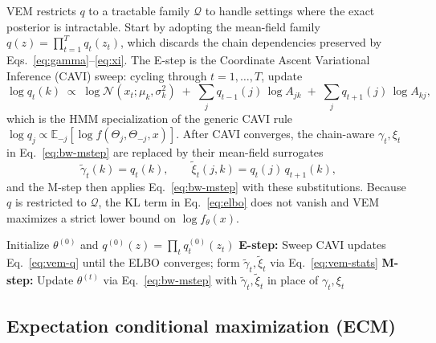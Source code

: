 \documentclass{article}
\newcommand{\E}{\mathbb{E}}
\newcommand{\KL}{\mathrm{KL}}
\begin{document}
VEM restricts $q$ to a tractable family $\mathcal{Q}$ to handle settings
where the exact posterior is intractable. Start by adopting the mean-field family
$q(z) = \prod_{t=1}^T q_t(z_t)$, which discards the chain dependencies
preserved by Eqs.~\eqref{eq:gamma}--\eqref{eq:xi}. The E-step is the
Coordinate Ascent Variational Inference (CAVI) sweep: cycling through $t = 1, \ldots, T$, update
\begin{equation}
  \log q_t(k) \;\propto\;
  \log \mathcal{N}(x_t; \mu_k, \sigma_k^2)
  \;+\; \sum_j q_{t-1}(j)\,\log A_{jk}
  \;+\; \sum_j q_{t+1}(j)\,\log A_{kj},
  \label{eq:vem-q}
\end{equation}
which is the HMM specialization of the generic CAVI rule
$\log q_j \propto \E_{-j}[\log f(\Theta_j, \Theta_{-j}, x)]$.
After CAVI converges, the chain-aware
$\gamma_t, \xi_t$ in Eq.~\eqref{eq:bw-mstep} are replaced by their
mean-field surrogates
\begin{equation}
  \tilde\gamma_t(k) = q_t(k), \qquad
  \tilde\xi_t(j,k)  = q_t(j)\, q_{t+1}(k),
  \label{eq:vem-stats}
\end{equation}
and the M-step then applies Eq.~\eqref{eq:bw-mstep} with these
substitutions. Because $q$ is restricted to $\mathcal{Q}$, the $\KL$
term in Eq.~\eqref{eq:elbo} does not vanish and VEM maximizes a strict
lower bound on $\log f_\theta(x)$.

\begin{algorithm}[ht]
  \caption{Variational EM (mean-field)}
  \begin{algorithmic}[1]
    \State Initialize $\theta^{(0)}$ and $q^{(0)}(z) = \prod_t q_t^{(0)}(z_t)$
    \Repeat
    \State \textbf{E-step:} Sweep CAVI updates Eq.~\eqref{eq:vem-q} until
    the ELBO converges; form $\tilde\gamma_t, \tilde\xi_t$ via
    Eq.~\eqref{eq:vem-stats}
    \State \textbf{M-step:} Update $\theta^{(t)}$ via
    Eq.~\eqref{eq:bw-mstep} with $\tilde\gamma_t, \tilde\xi_t$ in place
    of $\gamma_t, \xi_t$
  \end{algorithmic}
\end{algorithm}

\subsection{Expectation conditional maximization (ECM)}
\end{document}
